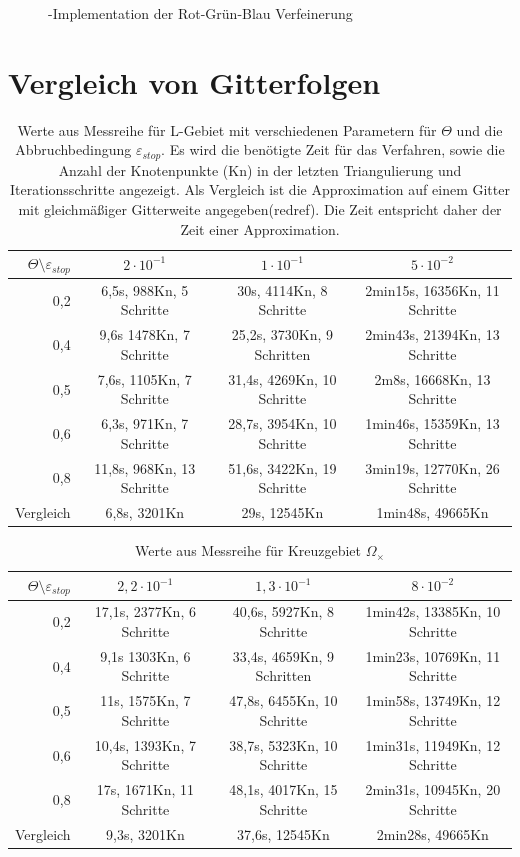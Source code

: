 \begin{figure}[!htbp]
	
	\caption{\label{redref} \matlab-Implementation der Rot-Grün-Blau Verfeinerung}
\end{figure}
\newpage \newpage \newpage  
\section{Vergleich von Gitterfolgen}
\begin{table}[!htbp]
	\begin{tabular}{r|c|c|c}
		$\Theta\setminus\varepsilon_{stop}$& $2\cdot10^{-1}$ & $1\cdot10^{-1}$&$5\cdot10^{-2}$ \\
		\hline
		0,2&6,5s, 988Kn, 5 Schritte&30s, 4114Kn, 8 Schritte&2min15s, 16356Kn, 11 Schritte\\	
		0,4&9,6s 1478Kn, 7 Schritte&25,2s, 3730Kn, 9 Schritten&2min43s, 21394Kn,  13 Schritte\\
		0,5&7,6s, 1105Kn, 7 Schritte&31,4s, 4269Kn, 10 Schritte&2m8s, 16668Kn, 13 Schritte\\
		0,6&6,3s, 971Kn, 7 Schritte&28,7s, 3954Kn, 10 Schritte&1min46s, 15359Kn,  13 Schritte\\
		0,8&11,8s, 968Kn, 13 Schritte&51,6s, 3422Kn, 19 Schritte&3min19s, 12770Kn,  26 Schritte\\
		\hline
		Vergleich&6,8s, 3201Kn&29s, 12545Kn&1min48s, 49665Kn\\
	\end{tabular}
	\caption{\label{Test}Werte aus Messreihe für L-Gebiet mit verschiedenen Parametern für $\Theta$ und die Abbruchbedingung $\varepsilon_{stop}$. Es wird die benötigte Zeit für das Verfahren, sowie die Anzahl der Knotenpunkte (Kn) in der letzten Triangulierung und Iterationsschritte angezeigt. Als Vergleich ist die Approximation auf einem Gitter mit gleichmäßiger Gitterweite angegeben(redref). Die Zeit entspricht daher der Zeit einer Approximation.}
\end{table}
\begin{table}[!htbp]
	\begin{tabular}{r|c|c|c}
		$\Theta\setminus\varepsilon_{stop}$& $2,2\cdot10^{-1}$ & $1,3\cdot10^{-1}$&$8\cdot10^{-2}$ \\
		\hline
		0,2&17,1s, 2377Kn, 6 Schritte&40,6s, 5927Kn, 8 Schritte&1min42s, 13385Kn, 10 Schritte\\	
		0,4&9,1s 1303Kn, 6 Schritte&33,4s, 4659Kn, 9 Schritten&1min23s, 10769Kn,  11 Schritte\\
		0,5&11s, 1575Kn, 7 Schritte&47,8s, 6455Kn, 10 Schritte&1min58s, 13749Kn, 12 Schritte\\
		0,6&10,4s, 1393Kn, 7 Schritte&38,7s, 5323Kn, 10 Schritte&1min31s, 11949Kn,  12 Schritte\\
		0,8&17s, 1671Kn, 11 Schritte&48,1s, 4017Kn, 15 Schritte&2min31s, 10945Kn,  20 Schritte\\
		\hline
		Vergleich&9,3s, 3201Kn&37,6s, 12545Kn&2min28s, 49665Kn\\
	\end{tabular}
	\caption{\label{Test2}Werte aus Messreihe für Kreuzgebiet $\Omega_\times$}
\end{table}
